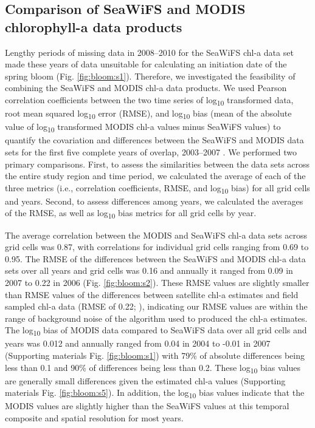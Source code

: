 \subsection{Comparison of SeaWiFS and MODIS chlorophyll-a data products}
\label{supp:bloom:A}

Lengthy periods of missing data in 2008--2010 for the SeaWiFS chl-a data set made
these years of data unsuitable for calculating an initiation date of the spring
bloom (Fig. \ref{fig:bloom:s1}). Therefore, we investigated the feasibility of
combining the SeaWiFS and MODIS chl-a data products. We used Pearson correlation
coefficients between the two time series of log\textsubscript{10} transformed
data, root mean squared log\textsubscript{10} error (RMSE), and
log\textsubscript{10} bias (mean of the absolute value of log\textsubscript{10}
transformed MODIS chl-a values minus SeaWiFS values) to quantify the covariation
and differences between the SeaWiFS and MODIS data sets for the first five
complete years of overlap, 2003--2007 \citep{Gregg2004, OReilly2000a, Zhang2006}
. We performed two primary comparisons. First, to assess the similarities
between the data sets across the entire study region and time period, we
calculated the average of each of the three metrics (i.e., correlation
coefficients, RMSE, and log\textsubscript{10} bias) for all grid cells and
years. Second, to assess differences among years, we calculated the averages of
the RMSE, as well as log\textsubscript{10} bias metrics for all grid cells by
year.

The average correlation between the MODIS and SeaWiFS chl-a data sets across
grid cells was 0.87, with correlations for individual grid cells ranging from
0.69 to 0.95. The RMSE of the differences between the SeaWiFS and MODIS chl-a
data sets over all years and grid cells was 0.16 and annually it ranged from
0.09 in 2007 to 0.22 in 2006 (Fig.  \ref{fig:bloom:s2}).  These RMSE values are
slightly smaller than RMSE values of the differences between satellite chl-a
estimates and field sampled chl-a data (RMSE of 0.22; \citealp{OReilly2000a}),
indicating our RMSE values are within the range of background noise of the
algorithm used to produced the chl-a estimates. The log\textsubscript{10} bias
of MODIS data compared to SeaWiFS data over all grid cells and years was 0.012
and annually ranged from 0.04 in 2004 to -0.01 in 2007 (Supporting materials
Fig. \ref{fig:bloom:s1}) with 79\% of absolute differences being less than 0.1
and 90\% of differences being less than 0.2. These log\textsubscript{10} bias
values are generally small differences given the estimated chl-a values
(Supporting materials Fig.  \ref{fig:bloom:s5}).  In addition, the
log\textsubscript{10} bias values indicate that the MODIS values are slightly
higher than the SeaWiFS values at this temporal composite and spatial resolution
for most years.

